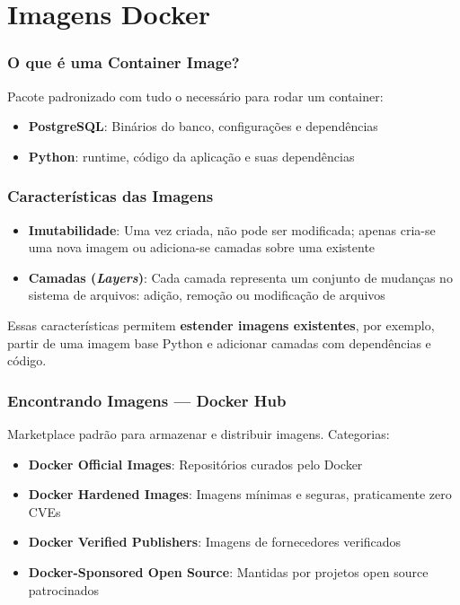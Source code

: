 \section{Imagens Docker}

\begin{frame}
  \frametitle{O que é uma Container Image?}
  Pacote padronizado com tudo o necessário para rodar um container:

  \vspace{0.5em}
  \begin{itemize}
    \item \textbf{PostgreSQL}: Binários do banco, configurações e dependências
    \item \textbf{Python}: runtime, código da aplicação e suas dependências
  \end{itemize}
\end{frame}

\begin{frame}
  \frametitle{Características das Imagens}
  \begin{itemize}
    \item \textbf{Imutabilidade}: Uma vez criada, não pode ser modificada;
          apenas cria-se uma nova imagem ou adiciona-se camadas sobre uma existente
    \item \textbf{Camadas (\textit{Layers})}: Cada camada representa um conjunto
          de mudanças no sistema de arquivos: adição, remoção ou modificação de arquivos
  \end{itemize}

  \vspace{0.5em}
  Essas características permitem \textbf{estender imagens existentes}, por exemplo,
  partir de uma imagem base Python e adicionar camadas com dependências e código.
\end{frame}

\begin{frame}
  \frametitle{Encontrando Imagens — Docker Hub}
  Marketplace padrão para armazenar e distribuir imagens. Categorias:

  \vspace{0.5em}
  \begin{itemize}
    \item \textbf{Docker Official Images}: Repositórios curados pelo Docker
    \item \textbf{Docker Hardened Images}: Imagens mínimas e seguras, praticamente zero CVEs
    \item \textbf{Docker Verified Publishers}: Imagens de fornecedores verificados
    \item \textbf{Docker-Sponsored Open Source}: Mantidas por projetos open source patrocinados
  \end{itemize}
\end{frame}

